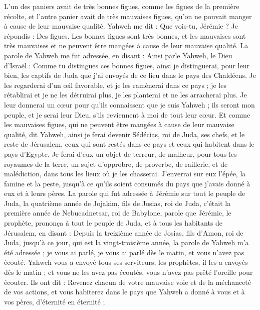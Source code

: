 \begin{multicols}{2}
L'un des paniers avait de très bonnes figues, comme les figues de la première récolte, et l'autre panier avait de très mauvaises figues, qu'on ne pouvait manger à cause de leur mauvaise qualité.
Yahweh me dit : Que vois-tu, Jérémie ? Je répondis : Des figues. Les bonnes figues sont très bonnes, et les mauvaises sont très mauvaises et ne peuvent être mangées à cause de leur mauvaise qualité.
La parole de Yahweh me fut adressée, en disant :
Ainsi parle Yahweh, le Dieu d'Israël : Comme tu distingues ces bonnes figues, ainsi je distinguerai, pour leur bien, les captifs de Juda que j'ai envoyés de ce lieu dans le pays des Chaldéens.
Je les regarderai d'un œil favorable, et je les ramènerai dans ce pays ; je les rétablirai et je ne les détruirai plus, je les planterai et ne les arracherai plus.
Je leur donnerai un cœur pour qu'ils connaissent que je suis Yahweh ; ils seront mon peuple, et je serai leur Dieu, s'ils reviennent à moi de tout leur cœur.
Et comme les mauvaises figues, qui ne peuvent être mangées à cause de leur mauvaise qualité, dit Yahweh, ainsi je ferai devenir Sédécias, roi de Juda, ses chefs, et le reste de Jérusalem, ceux qui sont restés dans ce pays et ceux qui habitent dans le pays d'Egypte.
Je ferai d'eux un objet de terreur, de malheur, pour tous les royaumes de la terre, un sujet d'opprobre, de proverbe, de raillerie, et de malédiction, dans tous les lieux où je les chasserai.
J'enverrai sur eux l'épée, la famine et la peste, jusqu'à ce qu'ils soient consumés du pays que j'avais donné à eux et à leurs pères.
\VerseOne{}La parole qui fut adressée à Jérémie sur tout le peuple de Juda, la quatrième année de Jojakim, fils de Josias, roi de Juda, c'était la première année de Nebucadnetsar, roi de Babylone,
parole que Jérémie, le prophète, prononça à tout le peuple de Juda, et à tous les habitants de Jérusalem, en disant :
Depuis la treizième année de Josias, fils d'Amon, roi de Juda, jusqu'à ce jour, qui est la vingt-troisième année, la parole de Yahweh m'a été adressée ; je vous ai parlé, je vous ai parlé dès le matin, et vous n'avez pas écouté.
Yahweh vous a envoyé tous ses serviteurs, les prophètes, il les a envoyés dès le matin ; et vous ne les avez pas écoutés, vous n'avez pas prêté l'oreille pour écouter.
Ils ont dit : Revenez chacun de votre mauvaise voie et de la méchanceté de vos actions, et vous habiterez dans le pays que Yahweh a donné à vous et à vos pères, d'éternité en éternité ;

\end{multicols}
